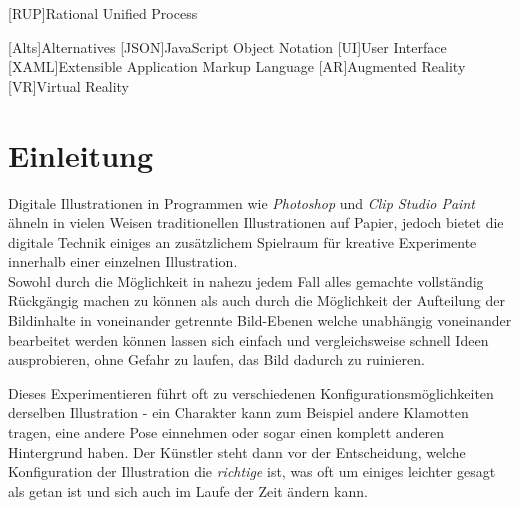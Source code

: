 \documentclass[oneside]{ausarbeitung}
\begin{document}
\listoffigures

\listoftables

\lstlistoflistings

\listofabbreviations
\begin{acronym}[Bsp.]  %

[RUP]{Rational Unified Process}

[Alts]{Alternatives}
[JSON]{JavaScript Object Notation}
[UI]{User Interface}
[XAML]{Extensible Application Markup Language}
[AR]{Augmented Reality}
[VR]{Virtual Reality}


\end{acronym}


\cleardoublepage
{}
\setcounter{page}{1}

\chapter{Einleitung}
\label{cha:einleitung}



Digitale Illustrationen in Programmen wie \textit{Photoshop} und \textit{Clip Studio Paint} ähneln in vielen Weisen traditionellen Illustrationen auf Papier, jedoch bietet die digitale Technik einiges an zusätzlichem Spielraum für kreative Experimente innerhalb einer einzelnen Illustration.\\
Sowohl durch die Möglichkeit in nahezu jedem Fall alles gemachte vollständig Rückgängig machen zu können als auch durch die Möglichkeit der Aufteilung der Bildinhalte in voneinander getrennte Bild-Ebenen welche unabhängig voneinander bearbeitet werden können lassen sich einfach und vergleichsweise schnell Ideen ausprobieren, ohne Gefahr zu laufen, das Bild dadurch zu ruinieren.

Dieses Experimentieren führt oft zu verschiedenen Konfigurationsmöglichkeiten derselben Illustration - ein Charakter kann zum Beispiel andere Klamotten tragen, eine andere Pose einnehmen oder sogar einen komplett anderen Hintergrund haben. Der Künstler steht dann vor der Entscheidung, welche Konfiguration der Illustration die \textit{richtige} ist, was oft um einiges leichter gesagt als getan ist und sich auch im Laufe der Zeit ändern kann.
\end{document}
